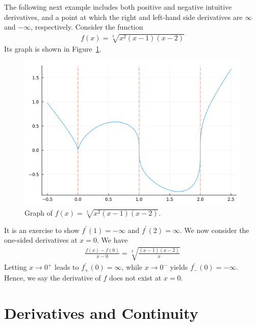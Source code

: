 \documentclass[thmcnt=section, 12pt]{my-elegantbook}
\begin{document}
\begin{example}
    The following next example includes both positive and negative intuitive derivatives, and a point at which the right and left-hand side derivatives are $\infty$ and $-\infty$, respectively. Consider the function 
    \begin{align*}
        f(x) = \sqrt[3]{x^2 (x-1) (x-2)}
    \end{align*}
    Its graph is shown in Figure~\ref{fig:3}.

    \begin{figure}[ht]
        \centering
        \includegraphics[scale=0.2]{figures/graph-003.png}
        \caption{Graph of $f(x) = \sqrt[3]{x^2 (x-1) (x-2)}$.}
        \label{fig:3}
    \end{figure}    

    It is an exercise to show $f^\prime(1) = -\infty$ and $f^\prime(2) = \infty$. We now consider the one-sided derivatives at $x = 0$. We have 
    \begin{align*}
        \frac{f(x) - f(0)}{x - 0}
        = \sqrt[3]{\frac{(x-1)(x-2)}{x}}
    \end{align*}
    Letting $x \to 0^{+}$ leads to $f^\prime_{+}(0) = \infty$, while $x \to 0^{-}$ yields $f^\prime_{-}(0) = -\infty$. Hence, we say the derivative of $f$ does not exist at $x = 0$.
    \label{eg:2}
\end{example}


\section{Derivatives and Continuity}
\end{document}

